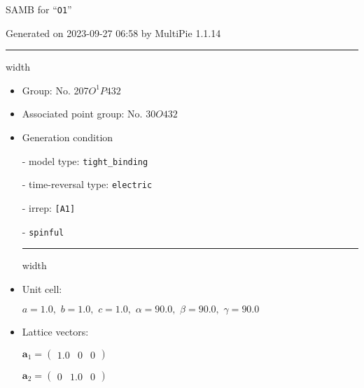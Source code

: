 \documentclass[fleqn,10pt,landscape]{article}
\begin{document}
\setcounter{MaxMatrixCols}{16}

\setlength{\baselineskip}{16pt}
\footnotesize
\begin{center}
\LARGE
SAMB for ``\texttt{O1}''
\end{center}
\begin{flushright}
Generated on 2023-09-27 06:58 by MultiPie 1.1.14
\end{flushright}
\vspace{1cm}


 \hfil \hrule height 1mm width \textwidth \hfil

\begin{itemize}
\item Group: No. 207\quad$O_{}^{1}$\quad$P432$\quad[ cubic ]

\item Associated point group: No. 30\quad$O$\quad$432$\quad[ cubic ]

\vspace{5mm}

\item Generation condition

\quad - model type: \texttt{tight_binding}

\quad - time-reversal type: \texttt{electric}

\quad - irrep: \texttt{[A1]}

\quad - \texttt{spinful}


 \hfil \hrule height 1mm width \textwidth \hfil

\item Unit cell:

\quad $a=1.0,\,\, b=1.0,\,\, c=1.0,\,\, \alpha=90.0,\,\, \beta=90.0,\,\, \gamma=90.0$

\item Lattice vectors:

\quad $\bm{a}_1=\begin{pmatrix} 1.0 & 0 & 0 \end{pmatrix}$

\quad $\bm{a}_2=\begin{pmatrix} 0 & 1.0 & 0 \end{pmatrix}$


\end{itemize}
\end{document}

